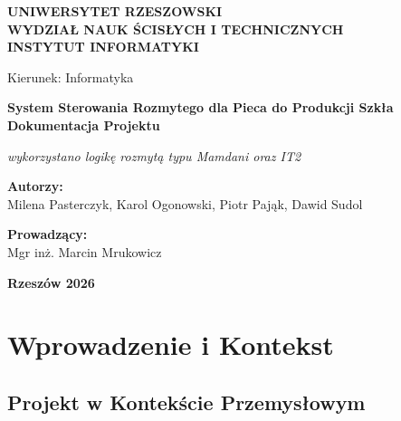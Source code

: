 \documentclass[12pt,a4paper]{article}
\newcommand{\myauthor}{Milena Pasterczyk, Karol Ogonowski, Piotr Pająk, Dawid Sudol}
\begin{document}
\begin{titlepage}
    \begin{center}
        \textbf{\large UNIWERSYTET RZESZOWSKI}\\[0.2cm]
        \textbf{\large WYDZIAŁ NAUK ŚCISŁYCH I TECHNICZNYCH}\\[0.2cm]
        \textbf{\large INSTYTUT INFORMATYKI}
        
        \vspace{4cm}
        
        Kierunek: Informatyka
        
        \vspace{2cm}
        
        \textbf{\LARGE System Sterowania Rozmytego dla Pieca do Produkcji Szkła}\\[0.5cm]
        \textbf{\Large Dokumentacja Projektu}
        
        \vspace{1.5cm}
        
        \textit{\small wykorzystano logikę rozmytą typu Mamdani oraz IT2}
        
        \vfill
        
        \begin{flushright}
            \textbf{Autorzy: }\\
            \myauthor
            
            \vspace{0.5cm}
            
            \textbf{Prowadzący:}\\
            Mgr inż. Marcin Mrukowicz
        \end{flushright}
        
        \vspace{2cm}
        
        \textbf{Rzeszów 2026}
    \end{center}
\end{titlepage}
\newpage

\tableofcontents
\newpage

\section{Wprowadzenie i Kontekst}

\subsection{Projekt w Kontekście Przemysłowym}
\end{document}
